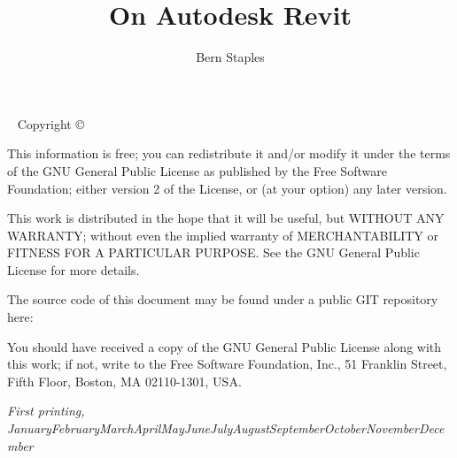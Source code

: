 \documentclass{tufte-book} %
\title{On Autodesk Revit} %
\author{Bern Staples} %
\newcommand{\monthyear}{\ifcase\month\or January\or February\or March\or April\or May\or June\or July\or August\or September\or October\or November\or December\fi\space\number\year} %
\begin{document}

\maketitle %


\newpage
\begin{fullwidth}
~\vfill
\thispagestyle{empty}
\setlength{\parindent}{0pt}
\setlength{\parskip}{\baselineskip}
Copyright \copyright\ \the\year\ \thanklessauthor

\par{}

\par{}

\par  This information is free; you can redistribute it and/or modify it
    under the terms of the GNU General Public License as published by
    the Free Software Foundation; either version 2 of the License, or
    (at your option) any later version.

    This work is distributed in the hope that it will be useful,
    but WITHOUT ANY WARRANTY; without even the implied warranty of
    MERCHANTABILITY or FITNESS FOR A PARTICULAR PURPOSE.  See the
    GNU General Public License for more details.
    
    The source code of this document may be found under a public GIT repository here: 

    You should have received a copy of the GNU General Public License
    along with this work; if not, write to the Free Software
    Foundation, Inc., 51 Franklin Street, Fifth Floor, Boston, MA 02110-1301, USA.

\par\textit{First printing, \monthyear}
\end{fullwidth}


\tableofcontents %

\end{document}
